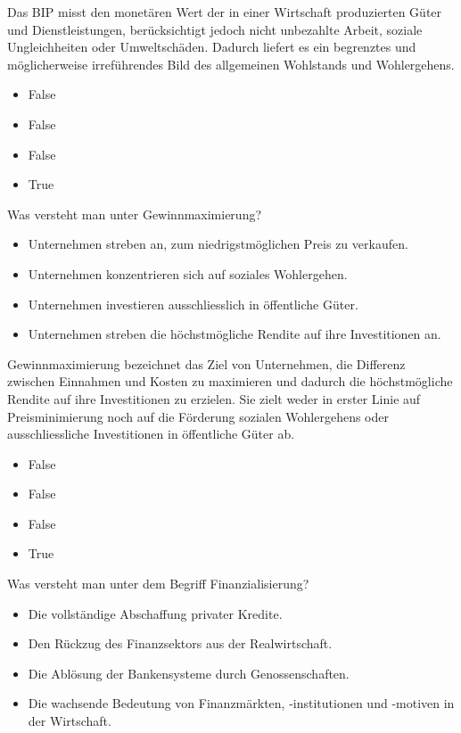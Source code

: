 \documentclass[
  nswissgerman,
  a4paper,
  openany]{book}
\providecommand{\tightlist}{%
  \setlength{\itemsep}{0pt}\setlength{\parskip}{0pt}}
\begin{document}
Das BIP misst den monetären Wert der in einer Wirtschaft produzierten
Güter und Dienstleistungen, berücksichtigt jedoch nicht unbezahlte
Arbeit, soziale Ungleichheiten oder Umweltschäden. Dadurch liefert es
ein begrenztes und möglicherweise irreführendes Bild des allgemeinen
Wohlstands und Wohlergehens.

\begin{itemize}
\tightlist
\item
  False
\item
  False
\item
  False
\item
  True
\end{itemize}

Was versteht man unter Gewinnmaximierung?

\begin{itemize}
\tightlist
\item[$\square$]
  Unternehmen streben an, zum niedrigstmöglichen Preis zu verkaufen.
\item[$\square$]
  Unternehmen konzentrieren sich auf soziales Wohlergehen.
\item[$\square$]
  Unternehmen investieren ausschliesslich in öffentliche Güter.
\item[$\square$]
  Unternehmen streben die höchstmögliche Rendite auf ihre Investitionen
  an.
\end{itemize}

Gewinnmaximierung bezeichnet das Ziel von Unternehmen, die Differenz
zwischen Einnahmen und Kosten zu maximieren und dadurch die
höchstmögliche Rendite auf ihre Investitionen zu erzielen. Sie zielt
weder in erster Linie auf Preisminimierung noch auf die Förderung
sozialen Wohlergehens oder ausschliessliche Investitionen in öffentliche
Güter ab.

\begin{itemize}
\tightlist
\item
  False
\item
  False
\item
  False
\item
  True
\end{itemize}

Was versteht man unter dem Begriff Finanzialisierung?

\begin{itemize}
\tightlist
\item[$\square$]
  Die vollständige Abschaffung privater Kredite.
\item[$\square$]
  Den Rückzug des Finanzsektors aus der Realwirtschaft.
\item[$\square$]
  Die Ablösung der Bankensysteme durch Genossenschaften.
\item[$\square$]
  Die wachsende Bedeutung von Finanzmärkten, -institutionen und -motiven
  in der Wirtschaft.
\end{itemize}
\end{document}
